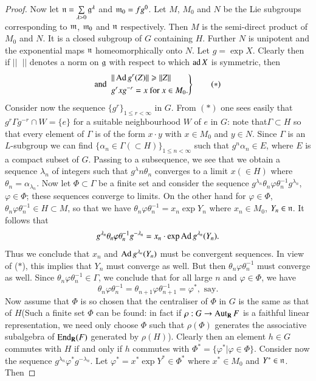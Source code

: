 \begin{proof}
Now let $\mathfrak{n} = \sum\limits_{\lambda > 0} \mathfrak{g}^{\lambda}$ and $\mathfrak{m}_0 = fg^0$. Let $M$, $M_0$ and $N$ be the Lie subgroups corresponding to $\mathfrak{m}$, $\mathfrak{m}_0$ and $\mathfrak{n}$ respectively. Then $M$ is the semi-direct product of $M_0$ and $N$. It is a closed subgroup of $G$ containing $H$. Further $N$ is unipotent and the exponential maps $\mathfrak{n}$ homeomorphically onto $N$. Let $g = \exp X$. Clearly then if $||\;\;||$ denotes a norm on $\mathfrak{g}$ with respect to which $\operatorname{ad} X$ is symmetric, then
\begin{equation*}
\text{and } 
\left.
\begin{aligned}
&|| \operatorname{Ad} g^r (Z) || \geqslant || Z||\\
& g^r x g^{-r} = x \text{ for } x \in M_0. 
\end{aligned}
\right\}
\tag*{$(\ast)$}
\end{equation*}
Consider now the sequence $\{g^r\}_{ 1 \leqslant r < \infty}$ in $G$. From $(\ast)$ one sees easily that $g^r \Gamma g^{-r} \cap W = \{e\}$ for a suitable neighbourhood $W$ of $e$ in $G$: note that\pageoriginale $\Gamma \subset H$ so that every element of $\Gamma$ is of the form $x \cdot y$ with $x \in M_0$ and $y \in N$. Since $\Gamma$ is an $L$-subgroup we can find $\{\alpha_n \in \Gamma (\subset H)\}_{1 \leqslant n < \infty}$ such that $g^n \alpha_n \in E$, where $E$ is a compact subset of $G$. Passing to a subsequence, we see that we obtain a sequence $\lambda_n$ of integers such that $g^\lambda n \theta_n$ converges to a limit $x (\in H)$ where $\theta_n = \alpha_{\lambda_n}$. Now let $\Phi \subset \Gamma$ be a finite set and consider the sequence $g^{\lambda_n} \theta_n \varphi \theta^{-1}_n g^{\lambda_n}$, $\varphi \in \Phi$; these sequences converge to limits. On the other hand for $\varphi \in \Phi$, $\theta_n \varphi \theta^{-1}_n \in H \subset M$, so that we have $\theta_n \varphi \theta^{-1}_n = x_n \exp Y_n $ where $x_n \in M_0$, $Y_n \in \mathfrak{n}$. It follows that 
$$
g^{\lambda_n} \theta_n \varphi \theta^{-1}_n g^{-\lambda_n} = x_n \cdot \exp \operatorname{Ad} g^{\lambda_n} (Y_n).
$$
Thus we conclude that $x_n$ and $\operatorname{Ad} g^{\lambda_n} (Y_n)$ must be convergent sequences. In view of ($\ast$), this implies that $Y_n$ must converge as well. But then $\theta_n \varphi \theta^{-1}_n$ must converge as well. Since $\theta_n \varphi \theta^{-1}_n \in \Gamma$, we conclude that for all large $n$ and $\varphi \in \Phi$, we have
$$
\theta_n \varphi \theta^{-1}_n = \theta_{n+1} \varphi \theta^{-1}_{n+1} = \varphi^\ast, \text{ say.}
$$
Now assume that $\Phi$ is so chosen that the centraliser of $\Phi$ in $G$ is the same as that of $H$(Such a finite set $\Phi$ can be found: in fact if $\rho : G \to \operatorname{Aut}_{\mathbf{R}} F$ is a faithful linear representation, we need only choose $\Phi$ such that $\rho (\Phi)$ generates the associative subalgebra of $\operatorname{End}_{\mathbf{R}} (F)$ generated by $\rho (H)$). Clearly then an element $h \in G$ commutes with $H$ if and only if $h$ commutes with $\Phi^\ast = \{\varphi^\ast \big| \varphi \in\Phi\}$. Consider now the sequence $g^{\lambda_n}\varphi^\ast g^{-\lambda_n}$. Let $\varphi^\ast = x^\ast \exp Y^\ast \in \Phi^\ast$ where $x^\ast \in M_0$ and $Y^\ast \in \mathfrak{n}$. Then

\end{proof}
